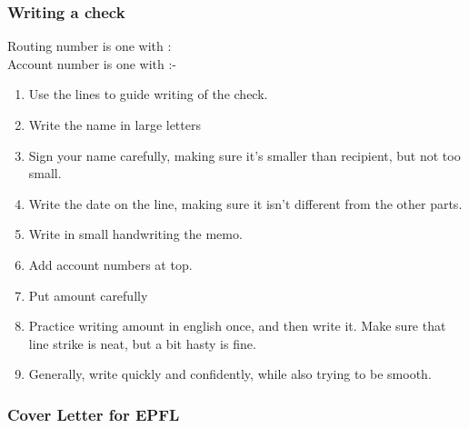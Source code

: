 \begin{frame}
\frametitle{ Writing a check }
{\small Routing number is one with :}  \\ 
{\small Account number is one with :- }
\begin{enumerate} 
\small \item \small Use the lines to guide writing of the check. 
\item \small Write the name in large letters 
\item \small Sign your name carefully, making sure it's smaller than recipient, but not too small. 
\item \small Write the date on the line, making sure it isn't different from the other parts. 
\item \small Write in small handwriting the memo.
\item \small Add account numbers at top. 
\item \small Put amount carefully 
\item \small Practice writing amount in english once, and then write
  it.  Make sure that line strike is neat, but a bit hasty is fine.

\item \small Generally, write quickly and confidently, while also trying to be smooth. 
\end{enumerate} 
\end{frame}
% 

 

\begin{frame}[label=cvrEPFL]
\frametitle{Cover Letter for EPFL}

\end{frame}

